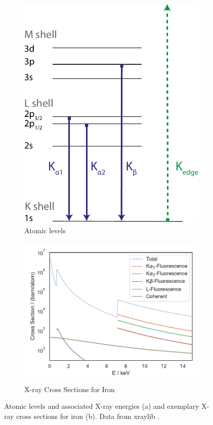 \begin{figure}
	\centering
	\begin{subfigure}[b]{0.35\textwidth}
		\includegraphics[width=\linewidth]{images/levels.pdf}
		\caption[Atomic Levels]{Atomic levels}
		\label{fig:levels}
	\end{subfigure}
	\begin{subfigure}[b]{0.45\textwidth}
		\includegraphics[width=\linewidth]{images/crosssectionFe.pdf}
		\caption[Cross Sections]{X-ray Cross Sections for Iron}
		\label{fig:cross}
	\end{subfigure}
\caption[Atomic levels and X-ray cross sections]{Atomic levels and associated X\nobreakdash-ray energies (a) and exemplary X-ray cross sections for iron (b). Data from xraylib \cite{xraylib}.}
\end{figure}


